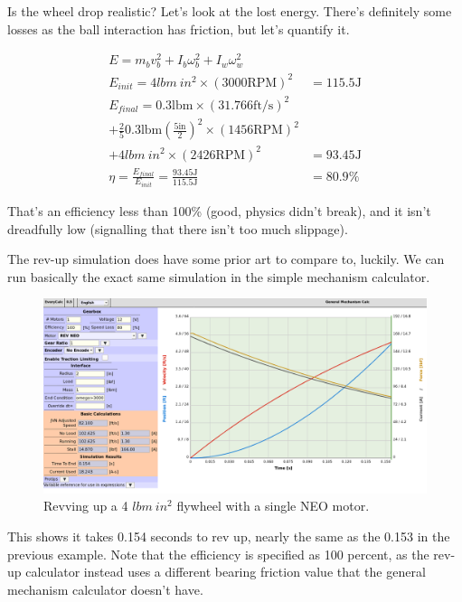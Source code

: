 \documentclass[10pt,letterpaper]{article}
\begin{document}
	Is the wheel drop realistic? Let's look at the lost energy. There's definitely some losses as the ball interaction has friction, but let's quantify it.

	\begin{align}
		E = m_b v_b^2 + I_b \omega_b^2 + I_w \omega_w^2 \\
		E_{init} = 4 \text{$lbm\ in^2$} \times (3000 \text{RPM})^2 &= 115.5 \text{J} \\
		E_{final} = 0.3 \text{lbm} \times (31.766 \text{ft/s})^2 \nonumber \\
		+ \frac{2}{5} 0.3 \text{lbm} (\frac{5 \text{in}}{2})^2 \times (1456 \text{RPM})^2 \nonumber \\
		+ 4 \text{$lbm\ in^2$} \times (2426 \text{RPM})^2 &= 93.45 \text{J} \\
		\eta = \frac{E_{final}}{E_{init}} = \frac{93.45 \text{J}}{115.5 \text{J}} &= 80.9 \% 
	\end{align}

	That's an efficiency less than 100\% (good, physics didn't break), and it isn't dreadfully low (signalling that there isn't too much slippage).

	The rev-up simulation does have some prior art to compare to, luckily. We can run basically the exact same simulation in the simple mechanism calculator.

	\begin{figure}[H]
		\includegraphics[width=\textwidth]{validation/hood_ECrev_A.png}
		\caption{Revving up a 4 $lbm\ in^2$ flywheel with a single NEO motor.}
	\end{figure}

	This shows it takes 0.154 seconds to rev up, nearly the same as the 0.153 in the previous example. Note that the efficiency is specified as 100 percent, as the rev-up calculator instead uses a different bearing friction value that the general mechanism calculator doesn't have.
\end{document}
